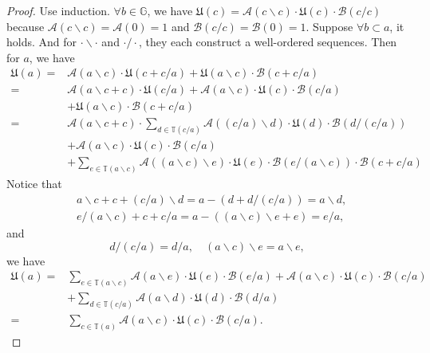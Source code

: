 \begin{proof}
    Use induction. \newline
    $\forall b \in\mathbb{G}$, we have $\mathfrak{U}(c) = \mathcal{A}(c\backslash c)\cdot\mathfrak{U}(c)\cdot\mathcal{B}(c/c)$ because $\mathcal{A}(c\backslash c) = \mathcal{A}(0) = 1$ and $\mathcal{B}(c/c) = \mathcal{B}(0) = 1$.
    Suppose $\forall b \subset a$, it holds.
    And for $\cdot\backslash\cdot$ and $\cdot/\cdot$, they each construct a well-ordered sequences.
    Then for $a$, we have
    \begin{align*}
        \mathfrak{U}(a) = &\mathcal{A}(a \backslash c)\cdot\mathfrak{U}(c + c/a) + \mathfrak{U}(a \backslash c)\cdot\mathcal{B}(c+c/a) \\
            = &\mathcal{A}(a \backslash c + c)\cdot\mathfrak{U}(c/a) + \mathcal{A}(a \backslash c)\cdot\mathfrak{U}(c)\cdot\mathcal{B}(c/a) \\
            &+ \mathfrak{U}(a \backslash c)\cdot\mathcal{B}(c + c/a) \\
            = &\mathcal{A}(a \backslash c + c)\cdot\sum_{d \in \mathbb{T}(c/a)}\mathcal{A}((c/a)\backslash d)\cdot\mathfrak{U}(d)\cdot\mathcal{B}(d/(c/a)) \\
            &+ \mathcal{A}(a \backslash c)\cdot\mathfrak{U}(c)\cdot\mathcal{B}(c/a)  \\
            &+\sum_{e \in \mathbb{T}(a \backslash c)}\mathcal{A}((a\backslash c)\backslash e)\cdot\mathfrak{U}(e)\cdot\mathcal{B}(e/(a\backslash c))\cdot\mathcal{B}(c + c/a)
    \end{align*}
    Notice that \begin{align*}
        &a \backslash c + c + (c/a)\backslash d = a - (d + d/(c/a)) = a\backslash d,\\
        &e/(a\backslash c) + c + c/a = a - ((a\backslash c)\backslash e + e) = e/a,
    \end{align*}
    and
    \[   d/(c/a) = d/a,\quad (a\backslash c)\backslash e = a \backslash e, \]
    we have
    \begin{align*}
        \mathfrak{U}(a) = & \sum_{e \in \mathbb{T}(a \backslash c)}\mathcal{A}(a\backslash e)\cdot\mathfrak{U}(e)\cdot\mathcal{B}(e/a) + \mathcal{A}(a \backslash c)\cdot\mathfrak{U}(c)\cdot\mathcal{B}(c/a) \\
            &+\sum_{d \in \mathbb{T}(c/a)}\mathcal{A}(a\backslash d)\cdot\mathfrak{U}(d)\cdot\mathcal{B}(d/a)\\
            = &\sum_{c \in \mathbb{T}(a)}\mathcal{A}(a \backslash c)\cdot\mathfrak{U}(c)\cdot\mathcal{B}(c/a).
    \end{align*}
\end{proof}
